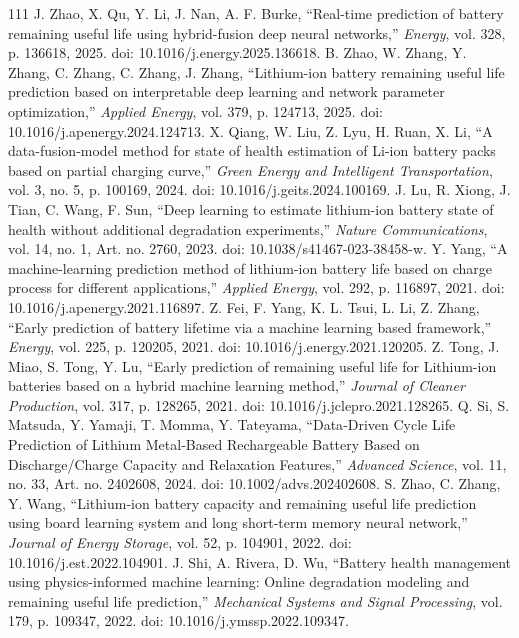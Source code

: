 \documentclass[journal]{IEEEtran}
\begin{document}
\begin{thebibliography}{111}
J. Zhao, X. Qu, Y. Li, J. Nan, A. F. Burke, ``Real-time prediction of battery remaining useful life using hybrid-fusion deep neural networks,'' \emph{Energy}, vol. 328, p. 136618, 2025. doi: 10.1016/j.energy.2025.136618.
B. Zhao, W. Zhang, Y. Zhang, C. Zhang, C. Zhang, J. Zhang, ``Lithium-ion battery remaining useful life prediction based on interpretable deep learning and network parameter optimization,'' \emph{Applied Energy}, vol. 379, p. 124713, 2025. doi: 10.1016/j.apenergy.2024.124713.
X. Qiang, W. Liu, Z. Lyu, H. Ruan, X. Li, ``A data-fusion-model method for state of health estimation of Li-ion battery packs based on partial charging curve,'' \emph{Green Energy and Intelligent Transportation}, vol. 3, no. 5, p. 100169, 2024. doi: 10.1016/j.geits.2024.100169.
J. Lu, R. Xiong, J. Tian, C. Wang, F. Sun, ``Deep learning to estimate lithium-ion battery state of health without additional degradation experiments,'' \emph{Nature Communications}, vol. 14, no. 1, Art. no. 2760, 2023. doi: 10.1038/s41467-023-38458-w.
Y. Yang, ``A machine-learning prediction method of lithium-ion battery life based on charge process for different applications,'' \emph{Applied Energy}, vol. 292, p. 116897, 2021. doi: 10.1016/j.apenergy.2021.116897.
Z. Fei, F. Yang, K. L. Tsui, L. Li, Z. Zhang, ``Early prediction of battery lifetime via a machine learning based framework,'' \emph{Energy}, vol. 225, p. 120205, 2021. doi: 10.1016/j.energy.2021.120205.
Z. Tong, J. Miao, S. Tong, Y. Lu, ``Early prediction of remaining useful life for Lithium-ion batteries based on a hybrid machine learning method,'' \emph{Journal of Cleaner Production}, vol. 317, p. 128265, 2021. doi: 10.1016/j.jclepro.2021.128265.
Q. Si, S. Matsuda, Y. Yamaji, T. Momma, Y. Tateyama, ``Data‐Driven Cycle Life Prediction of Lithium Metal‐Based Rechargeable Battery Based on Discharge/Charge Capacity and Relaxation Features,'' \emph{Advanced Science}, vol. 11, no. 33, Art. no. 2402608, 2024. doi: 10.1002/advs.202402608.
S. Zhao, C. Zhang, Y. Wang, ``Lithium-ion battery capacity and remaining useful life prediction using board learning system and long short-term memory neural network,'' \emph{Journal of Energy Storage}, vol. 52, p. 104901, 2022. doi: 10.1016/j.est.2022.104901.
J. Shi, A. Rivera, D. Wu, ``Battery health management using physics-informed machine learning: Online degradation modeling and remaining useful life prediction,'' \emph{Mechanical Systems and Signal Processing}, vol. 179, p. 109347, 2022. doi: 10.1016/j.ymssp.2022.109347.

\end{thebibliography}
\end{document}
